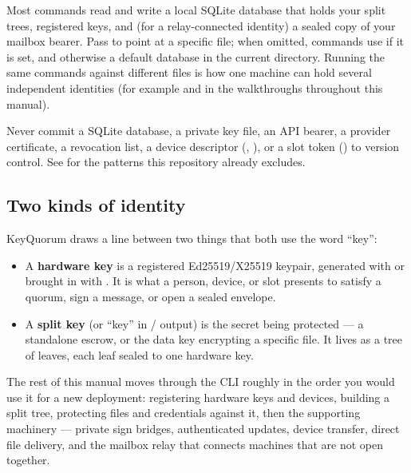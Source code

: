 Most commands read and write a local SQLite database that holds your split
trees, registered keys, and (for a relay-connected identity) a sealed copy
of your mailbox bearer. Pass  to point at a specific file; when
omitted, commands use  if it is set, and otherwise a
default database in the current directory. Running
the same commands against different  files is how one machine
can hold several independent identities (for example 
and  in the walkthroughs throughout this manual).

\begin{securityBox}
Never commit a SQLite database, a private key file, an API bearer, a
provider certificate, a revocation list, a device descriptor
(, ), or a slot token () to
version control. See  for the patterns this repository
already excludes.
\end{securityBox}

\subsection{Two kinds of identity}

KeyQuorum draws a line between two things that both use the word ``key'':

\begin{itemize}
  \item A \textbf{hardware key} is a registered Ed25519/X25519 keypair,
  generated with  or brought in with
  . It is what a person, device, or slot presents
  to satisfy a quorum, sign a message, or open a sealed envelope.
  \item A \textbf{split key} (or ``key'' in  / 
  output) is the secret being protected --- a standalone escrow, or the
  data key encrypting a specific file. It lives as a tree of leaves, each
  leaf sealed to one hardware key.
\end{itemize}

The rest of this manual moves through the CLI roughly in the order you
would use it for a new deployment: registering hardware keys and devices,
building a split tree, protecting files and credentials against it, then
the supporting machinery --- private sign bridges, authenticated updates,
device transfer, direct file delivery, and the mailbox relay that connects
machines that are not open together.
